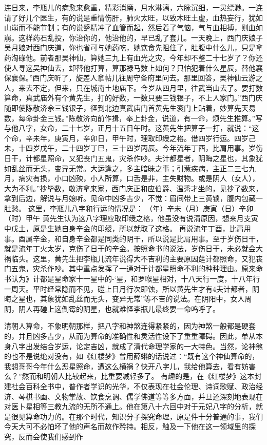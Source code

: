 连日来，李瓶儿的病愈来愈重，精彩消磨，月水淋漓，六脉沉细，一灵缥渺。一连请了好儿个医生，有的说是重情伤肝，肺火太旺，以致木旺土虚，血热妄行，犹如山崩而不能节制；有的说蹙精冲了血管而起，然后着了气恼，气与血相搏，则血如崩。这样药石乱投，你治你的，他治他的，早已乱了套儿。一天晚上，西门庆娘子吴月娘对西门庆道，你也省可与她药吃，她饮食先阻住了，肚腹中什么儿，只是拿药淘碌他。前者那吴神仙，算她三九上有血光之灾，今年却不整二十七岁了？你还使人寻这吴神仙去，却替他打算，算那禄马数上如何？只怕犯着什么星辰，替他襄保襄保。”西门庆听了，旋差人拿帖儿往周守备府里问去。那里回答，吴神仙云游之人，来去不定，但来，只在城南土地庙下。今岁从四月里，往武当山去了。要打数算命，真武庙外有个黄先生，打的好数，一数只要三钱银子，不上人家门。”西门庆随即使陈敬济佘三钱银子，径到北边真武庙门首黄先生衮门上贴着，妙算先天易数，每命卦金三钱。”陈敬济向前作揖，奉上卦金，说道，有一命，烦先生推算。”写与他八字，女命，二十七岁，正月十五日午时。这黄先生把算子一打，就说：“这个命，辛未年，庚寅月，辛卯日，甲午时，理取印绶之格。借四岁行运。四岁己未，十四岁戊午，二十四岁丁巳，三十四岁丙辰。今年流年丁酉，比肩用事。岁伤日干，计都星照命，又犯丧门五鬼，灾杀作吵。夫计都星者，阴晦之星也，其象犹如乱丝而无头，变异无常。大运逢之，多主暗昧之事；引惹疾病，主正二三七九月，病灾有损，小口凶殃，小人所算，口舌是非，主失财物。或是阴人（女人），大为不利。”抄毕数，敬济拿来家，西门庆正和应伯爵、温秀才坐的，见抄了数来，拿到后边，解说与月娘听。见命中凶多吉少，不觉：眉间带上三黄锁，腹内包藏一肚愁。
这里，李瓶儿八字和行运的情况是：
（年）辛未（月）庚寅（日）辛卯（时）甲午
黄先生认为这八字理应取印绶之格，他虽没有说清原因，想来月支寅中戊土，原是生她自身辛金的印绶，所以就取了这格。
再说流年丁酉，比肩用事。酉属辛金，和自身辛金都是同类的阴干，所以说是比肩用事。至于岁伤日干，就是流年丁火太岁，克伤了日干的辛金。按照命书的说法，岁伤日干，未必就会大祸临头。这里，黄先生把李瓶儿流年说得大不吉利的主要原因莛计都照命，又犯丧门五鬼，灾杀作吵。其中重点发挥了一通对于计都星照命不利的种种理由。原来命书认为》计都是星命家十一星中的-‘星，和罗喉星相对，十八天行一度，十八年行一周天。平时经常隐而不见，碰上日月行次即蚀，所以黄先生才有4夫计都者，阴晦之星也，其象犹如乱丝而无头，变异无常”等不吉的说法。在阴阳中，女人周阴，阴人再碰上这倒霉的阴星，也就难怪李瓶儿最终要一命呜呼了。

清朝人算命，不象明朝那样，把八字和神煞连得紧紧的，因为神煞一般都是硬套的，并且凶多吉少，从而为算命的准确性和灵活性设下了重重障碍。因此，单从本身八字出发结合岁运，论定吉凶，就成了清代命理学家的一大特色。当然，论神煞的也不是说绝对没有，如《红楼梦》曾用薛蝌的话说过：“既有这个神仙算命的，我想哥哥今年什么恶星照命，遭这么横祸？快开八字儿，我给他算去，看有妨害么？”然而和明朝人比较起来，比重要减轻多了。
有趣的是，在《红楼梦》这本封建社会百科全书中，普作者学识的光华，不仅表现在社会伦理、诗词歌赋、政治经济、琴棋书画、文物掌故、饮食烹调、儒学佛道等等多方面，并旦还深刻地表现在对医卜星相等三教九流的无所不通上。他在第八十六回中对于元妃八字的分析，就是很见算命功力的。在那个时代，知识分子探究命理，原是件十分普通的事，我们今天大可不必怕坏了他的声名而故作矜持。相反，触及一下他在这一领域里的探究，反而会使我们感到作

